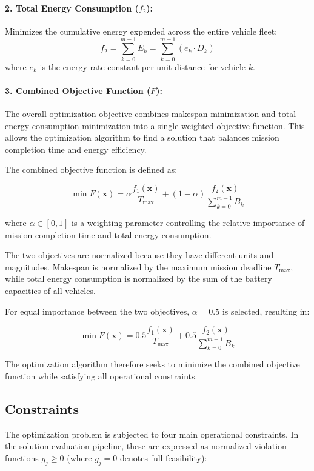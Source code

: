 \paragraph{2. Total Energy Consumption ($f_2$):}
Minimizes the cumulative energy expended across the entire vehicle fleet:
\begin{equation}
    f_2 = \sum_{k=0}^{m-1} E_k = \sum_{k=0}^{m-1} \left( e_k \cdot D_k \right)
\end{equation}
where $e_k$ is the energy rate constant per unit distance for vehicle $k$.


\paragraph{3. Combined Objective Function ($F$):}
The overall optimization objective combines makespan minimization and total energy consumption minimization into a single weighted objective function. This allows the optimization algorithm to find a solution that balances mission completion time and energy efficiency.

The combined objective function is defined as:

\begin{equation}
    \min F(\mathbf{x}) =
    \alpha \frac{f_1(\mathbf{x})}{T_{\max}}
    + (1-\alpha)
    \frac{f_2(\mathbf{x})}{\sum_{k=0}^{m-1} B_k}
\end{equation}

where $\alpha \in [0,1]$ is a weighting parameter controlling the relative importance of mission completion time and total energy consumption.

The two objectives are normalized because they have different units and magnitudes. Makespan is normalized by the maximum mission deadline $T_{\max}$, while total energy consumption is normalized by the sum of the battery capacities of all vehicles.

For equal importance between the two objectives, $\alpha = 0.5$ is selected, resulting in:

\begin{equation}
    \min F(\mathbf{x}) =
    0.5 \frac{f_1(\mathbf{x})}{T_{\max}}
    + 0.5
    \frac{f_2(\mathbf{x})}{\sum_{k=0}^{m-1} B_k}
\end{equation}

The optimization algorithm therefore seeks to minimize the combined objective function while satisfying all operational constraints.


\subsection{Constraints}
The optimization problem is subjected to four main operational constraints. In the solution evaluation pipeline, these are expressed as normalized violation functions $g_j \ge 0$ (where $g_j = 0$ denotes full feasibility):

